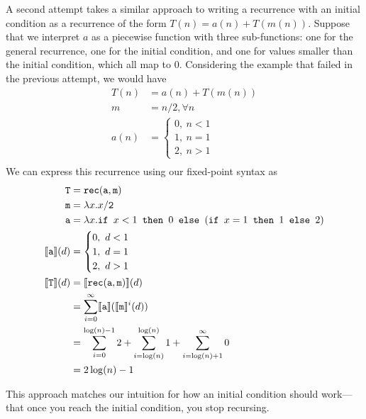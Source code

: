 A second attempt takes a similar approach to writing a recurrence with an initial condition as a recurrence of 
the form $T(n) = a(n) + T(m(n))$. Suppose that we interpret $a$ as a piecewise function with three sub-functions:
one for the general recurrence, one for the initial condition, and one for values smaller than the initial condition, which all
map to $0$. Considering the example that failed in the previous attempt, we would have
\begin{align*}
T(n) &= a(n) + T(m(n)) \\
m &= n/2, \forall n \\
a(n) &=
\begin{cases}
0, \ n < 1 \\
1, \ n = 1 \\
2, \ n > 1
\end{cases} \\
\end{align*}
We can express this recurrence using our fixed-point syntax as
\begin{align*}
\texttt{T} &= \texttt{rec}(\texttt{a},\texttt{m}) \\
\texttt{m} &= \lambda x.x/\texttt{2} \\
\texttt{a} &= \lambda x.\texttt{if } x <1 \texttt{ then } 0 \texttt{ else } (\texttt{if } x = 1 \texttt{ then } 1 \texttt{ else } 2) \\
\llbracket \texttt{a} \rrbracket(d) &= 
 \begin{cases}
0, \ d < 1 \\
1, \ d = 1 \\
2, \ d > 1 
\end{cases} \\
\llbracket \texttt{T} \rrbracket(d) &= \llbracket \texttt{rec}(\texttt{a},\texttt{m})\rrbracket(d) \\
&= \sum_{i=0}^{\infty}\llbracket \texttt{a} \rrbracket(\llbracket \texttt{m}\rrbracket^i(d)) \\
&= \sum_{i=0}^{\log(n)-1} 2 + \sum_{i=\log(n) }^{\log(n)} 1 + \sum_{i = \log(n) + 1}^{\infty} 0 \\
&= 2\log(n) - 1
\end{align*}

This approach matches our intuition for how an initial condition should work---that once you reach the initial condition,
you stop recursing. 

